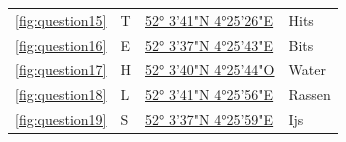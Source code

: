 \documentclass{article}
\newcommand{\locfifteen}{52° 3'41"N   4°25'26"E}
\newcommand{\urlfifteen}{https://forms.gle/CsswAmKTqAnjPW3g6}
\newcommand{\letterfifteen}{T}
\newcommand{\notefifteen}{Hits}
\newcommand{\locsixteen}{52° 3'37"N   4°25'43"E}
\newcommand{\urlsixteen}{https://forms.gle/um8pEDnNAeL1AL1G7}
\newcommand{\lettersixteen}{E}
\newcommand{\notesixteen}{Bits}
\newcommand{\locseventeen}{52° 3'40"N   4°25'44"O}
\newcommand{\urlseventeen}{https://forms.gle/LAk3cUTvpDe4LhZz6}
\newcommand{\letterseventeen}{H}
\newcommand{\noteseventeen}{Water}
\newcommand{\loceighteen}{52° 3'41"N   4°25'56"E}
\newcommand{\urleighteen}{https://forms.gle/7UkP2jCqfeJkovHo6}
\newcommand{\lettereighteen}{L}
\newcommand{\noteeighteen}{Rassen}
\newcommand{\locnineteen}{ 52° 3'37"N  4°25'59"E}
\newcommand{\urlnineteen}{https://forms.gle/jk2t55bF1WY2V7DA7}
\newcommand{\letternineteen}{S}
\newcommand{\notenineteen}{Ijs}
\begin{document}
\begin{tabular}{llll}
            \ref{fig:question15} & \letterfifteen  & \href{\urlfifteen}{\locfifteen} & \notefifteen \\
            \ref{fig:question16} & \lettersixteen  & \href{\urlsixteen}{\locsixteen} & \notesixteen \\
            \ref{fig:question17} & \letterseventeen  & \href{\urlseventeen}{\locseventeen} & \noteseventeen \\
            \ref{fig:question18} & \lettereighteen  & \href{\urleighteen}{\loceighteen} & \noteeighteen \\
            \ref{fig:question19} & \letternineteen  & \href{\urlnineteen}{\locnineteen} & \notenineteen \\
            \bottomrule
        \end{tabular}\label{tab:table}
\end{document}
